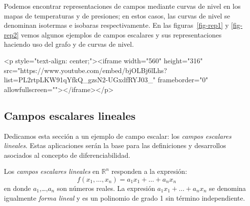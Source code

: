 Podemos encontrar representaciones de campos mediante curvas de nivel en los mapas de temperaturas y de presiones;
en estos casos, las curvas de nivel se denominan isotermas e isobaras respectivamente.
En las figuras~\ref{fig-rep1} y \ref{fig-rep2} vemos algunos ejemplos de campos escalares y sus representaciones haciendo uso del grafo y de curvas de nivel.

\begin{rawhtml}
<p style="text-align: center;"><iframe width="560" height="316" src="https://www.youtube.com/embed/bjOLBj6lLhs?list=PL2rtpLKW91qYfkQ_gzsN2-UGxdfRYJ03_" frameborder="0" allowfullscreen=""></iframe></p>
\end{rawhtml}

\subsection{Campos escalares lineales}\label{sec:lin}

Dedicamos esta sección a un ejemplo de campo escalar: los \emph{campos escalares lineales}.
Estas aplicaciones serán la base para las definiciones y desarrollos asociados al concepto de diferenciabilidad.

Los \emph{campos escalares lineales} en $\mathbb{R}^n$ responden a la expresión:
\[
f(x_1,\dots,x_n) = a_1x_1+\dots+a_nx_n
\]
en donde $a_1$,\dots,$a_n$ son números reales.
La expresión $a_1x_1+\dots+a_nx_n$ se denomina igualmente \emph{forma lineal} y es un polinomio de grado 1 sin término independiente.

